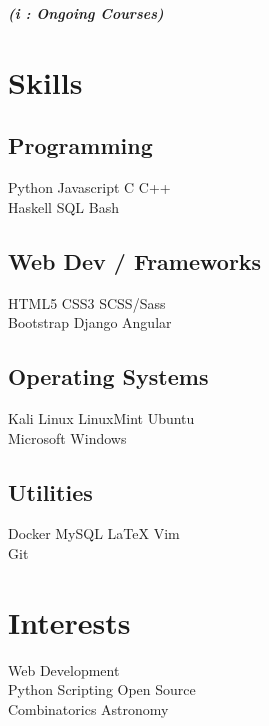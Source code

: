 \documentclass[]{deedy-resume-openfont}
\begin{document}
\begin{minipage}[t]{0.33\textwidth}
{\footnotesize \textit{\textbf{ (\textit{i} : Ongoing Courses)}}}


\section{Skills}
\subsection{Programming}
Python \textbullet{} Javascript \textbullet{} C \textbullet{} C++ \\  
 \vspace{0.1 cm}
Haskell \textbullet{} SQL \textbullet{} Bash \\
\vspace{0.3 cm} 
\subsection{Web Dev / Frameworks}
HTML5 \textbullet{} CSS3 \textbullet{}  SCSS/Sass \\ 
Bootstrap \textbullet{} Django \textbullet{} Angular \\
\vspace{0.3 cm}
\subsection{Operating Systems}
Kali Linux \textbullet{} LinuxMint \textbullet{} Ubuntu \\
Microsoft Windows
\vspace{0.3 cm}
\subsection{Utilities}
Docker \textbullet{} MySQL \textbullet{} \LaTeX{} \textbullet{} Vim \\
Git  \\


\section{Interests}
Web Development  \\
Python Scripting \textbullet{} Open Source \\
Combinatorics  \textbullet{} Astronomy \\
%
%

\end{minipage} 
\end{document}

